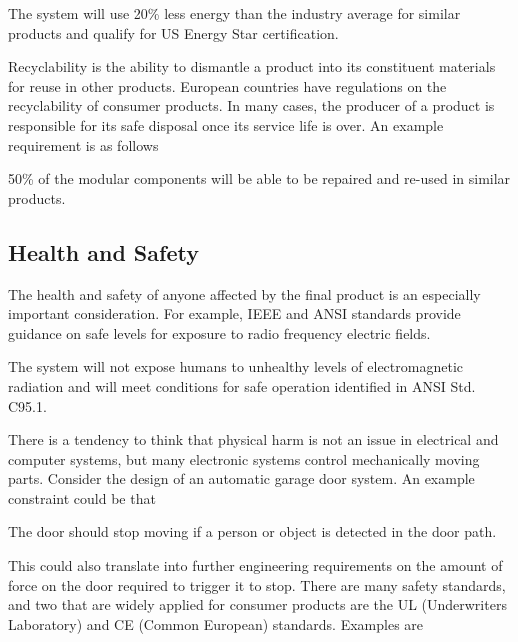 \begin{itquote}
The system will use 20\% less energy than the industry average for
similar products and qualify for US Energy Star certification.
\end{itquote}

Recyclability is the ability to dismantle a product into its constituent
materials for reuse in other products. European countries have
regulations on the recyclability of consumer products. In many cases,
the producer of a product is responsible for its safe disposal once its
service life is over. An example requirement is as follows

\begin{itquote}
50\% of the modular components will be able to be repaired and re-used
in similar products.
\end{itquote}

\subsection*{Health and Safety}
\label{subsection:health-and-safety}

The health and safety of anyone affected by the final product is an
especially important consideration. For example, IEEE and ANSI standards
provide guidance on safe levels for exposure to radio frequency electric
fields.

\begin{itquote}
The system will not expose humans to unhealthy levels of
electromagnetic radiation and will meet conditions for safe operation
identified in ANSI Std. C95.1.
\end{itquote}

There is a tendency to think that physical harm is not an issue in
electrical and computer systems, but many electronic systems control
mechanically moving parts. Consider the design of an automatic garage
door system. An example constraint could be that

\begin{itquote}
The door should stop moving if a person or object is detected in the
door path.
\end{itquote}

This could also translate into further engineering requirements on the
amount of force on the door required to trigger it to stop. There are
many safety standards, and two that are widely applied for consumer
products are the UL (Underwriters Laboratory) and CE (Common European)
standards. Examples are

